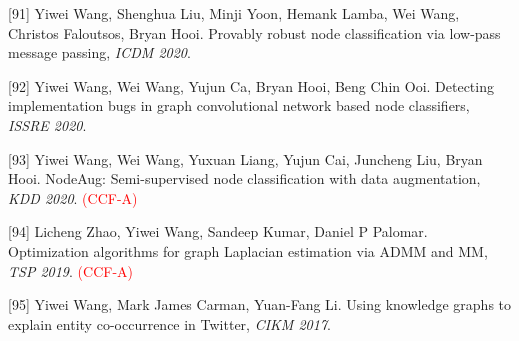 [91] Yiwei Wang, Shenghua Liu, Minji Yoon, Hemank Lamba, Wei Wang, Christos Faloutsos, Bryan Hooi. Provably robust node classification via low-pass message passing, \textit{ICDM 2020}.

[92] Yiwei Wang, Wei Wang, Yujun Ca, Bryan Hooi, Beng Chin Ooi. Detecting implementation bugs in graph convolutional network based node classifiers, \textit{ISSRE 2020}.

[93] Yiwei Wang, Wei Wang, Yuxuan Liang, Yujun Cai, Juncheng Liu, Bryan Hooi. NodeAug: Semi-supervised node classification with data augmentation, \textit{KDD 2020}. \textcolor{red}{(CCF-A)}

[94] Licheng Zhao, Yiwei Wang, Sandeep Kumar, Daniel P Palomar. Optimization algorithms for graph Laplacian estimation via ADMM and MM, \textit{TSP 2019}. \textcolor{red}{(CCF-A)}

[95] Yiwei Wang, Mark James Carman, Yuan-Fang Li. Using knowledge graphs to explain entity co-occurrence in Twitter, \textit{CIKM 2017}.